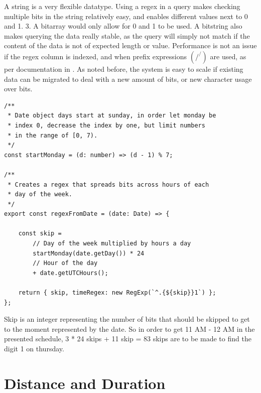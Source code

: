 A string is a very flexible datatype. Using a regex in a query makes checking multiple bits in the string relatively easy, and enables different values next to 0 and 1. 3. A bitarray would only allow for 0 and 1 to be used. A bitstring also makes querying the data really stable, as the query will simply not match if the content of the data is not of expected length or value. Performance is not an issue if the regex column is indexed, and when prefix expressions $(/^/)$ are used, as per documentation in \cite{MongoDB-Regex}. As noted before, the system is easy to scale if existing data can be migrated to deal with a new amount of bits, or new character usage over bits.

\begin{lstlisting}[caption={Opening timeframe.}, label={lst:open-timeframe}]
/**
 * Date object days start at sunday, in order let monday be
 * index 0, decrease the index by one, but limit numbers
 * in the range of [0, 7).
 */
const startMonday = (d: number) => (d - 1) % 7;

/**
 * Creates a regex that spreads bits across hours of each
 * day of the week.
 */
export const regexFromDate = (date: Date) => {

	const skip =
		// Day of the week multiplied by hours a day
		startMonday(date.getDay()) * 24
		// Hour of the day
		+ date.getUTCHours();

	return { skip, timeRegex: new RegExp(`^.{${skip}}1`) };
};
\end{lstlisting}

Skip is an integer representing the number of bits that should be skipped to get to the moment represented by the date. So in order to get 11 AM - 12 AM in the presented schedule, 3 * 24 skips + 11 skip = 83 skips are to be made to find the digit 1 on thursday.

%
\section{Distance and Duration}


%
